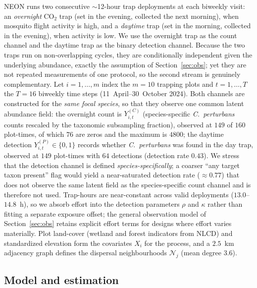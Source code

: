 \documentclass[preprint,12pt]{elsarticle}
\theoremstyle{definition}
\begin{document}
NEON runs two consecutive $\sim$12-hour trap deployments at each biweekly
visit: an \emph{overnight} $\mathrm{CO}_2$ trap (set in the evening, collected
the next morning), when mosquito flight activity is high, and a \emph{daytime}
trap (set in the morning, collected in the evening), when activity is low. We
use the overnight trap as the count channel and the daytime trap as the binary
detection channel. Because the two traps run on non-overlapping cycles, they
are conditionally independent given the underlying abundance, exactly the
assumption of Section~\ref{sec:obs}; yet they are not repeated measurements of
one protocol, so the second stream is genuinely complementary. Let
$i=1,\ldots,m$ index the $m=10$ trapping plots and $t=1,\ldots,T$ the $T=16$
biweekly time steps (11~April--30~October 2024). Both channels are constructed
for the \emph{same focal species}, so that they observe one common latent
abundance field: the overnight count is $Y^{(C)}_{i,t}$
(species-specific \emph{C.~perturbans} counts rescaled by the taxonomic
subsampling fraction), observed at $149$ of $160$ plot-times, of which $76$ are
zeros and the maximum is $4800$; the daytime detection $Y^{(P)}_{i,t}\in\{0,1\}$
records whether \emph{C.~perturbans} was found in the day trap, observed at
$149$ plot-times with $64$ detections (detection rate $0.43$). We stress that
the detection channel is defined \emph{species-specifically}; a coarser
``any target taxon present'' flag would yield a near-saturated detection rate
($\approx0.77$) that does not observe the same latent field as the
species-specific count channel and is therefore not used.
Trap-hours are near-constant across valid deployments ($13.0$--$14.8$~h), so we
absorb effort into the detection parameters $\rho$ and $\kappa$ rather than
fitting a separate exposure offset; the general observation model of
Section~\ref{sec:obs} retains explicit effort terms for designs where effort
varies materially. Plot
land-cover (wetland and forest indicators from NLCD) and standardized
elevation form the covariates $X_i$ for the process, and a $2.5$~km adjacency
graph defines the dispersal neighbourhoods $\mathcal N_j$
(mean degree $3.6$).

\subsection{Model and estimation}
\label{sec:neon-model}
\end{document}
